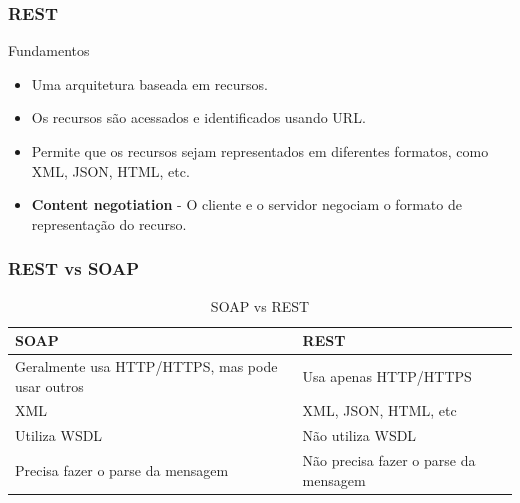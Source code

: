 \documentclass[
	10pt, %
	t, %
]{beamer}
\begin{document}
\begin{frame}
	\frametitle{REST}
	
	\begin{exampleblock}{Fundamentos}
		\begin{itemize}
			\item Uma arquitetura baseada em recursos.
			\item Os recursos são acessados e identificados usando URL.
			\item Permite que os recursos sejam representados em diferentes formatos, como XML, JSON, HTML, etc.
			\item \textbf{Content negotiation} - O cliente e o servidor negociam o formato de representação do recurso.
		\end{itemize}
	\end{exampleblock}

\end{frame}

\begin{frame}
	\frametitle{REST vs SOAP}
	
	\begin{table}
		\begin{tabular}{|l|l|}
			\toprule
			\textbf{SOAP} & \textbf{REST} \\
			\hline
			Geralmente usa HTTP/HTTPS, mas pode usar outros & Usa apenas HTTP/HTTPS \\
			XML & XML, JSON, HTML, etc \\
			Utiliza WSDL & Não utiliza WSDL \\
			Precisa fazer o parse da mensagem & Não precisa fazer o parse da mensagem \\
			\bottomrule
		\end{tabular}
		\caption{SOAP vs REST}
		\label{tab:soap_rest}

	\end{table}

\end{frame}
\end{document}
